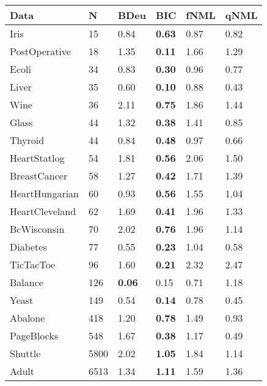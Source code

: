 \begin{tabular}{llllll}
\toprule
           Data &     N &           BDeu &            BIC &  fNML &  qNML \\
\midrule
           Iris &    15 &           0.84 &  \textbf{0.63} &  0.87 &  0.82 \\
  PostOperative &    18 &           1.35 &  \textbf{0.11} &  1.66 &  1.29 \\
          Ecoli &    34 &           0.83 &  \textbf{0.30} &  0.96 &  0.77 \\
          Liver &    35 &           0.60 &  \textbf{0.10} &  0.88 &  0.43 \\
           Wine &    36 &           2.11 &  \textbf{0.75} &  1.86 &  1.44 \\
          Glass &    44 &           1.32 &  \textbf{0.38} &  1.41 &  0.85 \\
        Thyroid &    44 &           0.84 &  \textbf{0.48} &  0.97 &  0.66 \\
   HeartStatlog &    54 &           1.81 &  \textbf{0.56} &  2.06 &  1.50 \\
   BreastCancer &    58 &           1.27 &  \textbf{0.42} &  1.71 &  1.39 \\
 HeartHungarian &    60 &           0.93 &  \textbf{0.56} &  1.55 &  1.04 \\
 HeartCleveland &    62 &           1.69 &  \textbf{0.41} &  1.96 &  1.33 \\
    BcWisconsin &    70 &           2.02 &  \textbf{0.76} &  1.96 &  1.14 \\
       Diabetes &    77 &           0.55 &  \textbf{0.23} &  1.04 &  0.58 \\
      TicTacToe &    96 &           1.60 &  \textbf{0.21} &  2.32 &  2.47 \\
        Balance &   126 &  \textbf{0.06} &           0.15 &  0.71 &  1.18 \\
          Yeast &   149 &           0.54 &  \textbf{0.14} &  0.78 &  0.45 \\
        Abalone &   418 &           1.20 &  \textbf{0.78} &  1.49 &  0.93 \\
     PageBlocks &   548 &           1.67 &  \textbf{0.38} &  1.17 &  0.49 \\
        Shuttle &  5800 &           2.02 &  \textbf{1.05} &  1.84 &  1.14 \\
          Adult &  6513 &           1.34 &  \textbf{1.11} &  1.59 &  1.36 \\
\bottomrule
\end{tabular}
